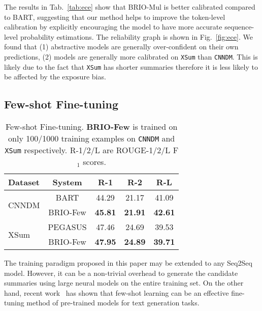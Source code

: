 \documentclass[11pt]{article}
\newcommand{\model}{BRIO\xspace}
\begin{document}
The results in Tab.~\ref{tab:ece} show that \model-Mul is better calibrated compared to BART, suggesting that our method helps to improve the token-level calibration by explicitly encouraging the model to have more accurate sequence-level probability estimations.
The reliability graph is shown in Fig.~\ref{fig:ece}.
We found that (1) abstractive models are generally over-confident on their own predictions, 
(2) models are generally more calibrated on \texttt{XSum} than \texttt{CNNDM}.
This is likely due to the fact that \texttt{XSum} has shorter summaries therefore it is less likely to be affected by the exposure bias. 





\subsection{Few-shot Fine-tuning}

\begin{table}
\centering
\small
\begin{tabular}{lcccc}
\toprule
\textbf{Dataset} & \textbf{System} & \textbf{R-1} & \textbf{R-2} & \textbf{R-L}  \\
\midrule
 \multirow{2}{*}{CNNDM} & BART & 44.29 & 21.17 & 41.09 \\
& \model-Few & \textbf{45.81} & \textbf{21.91} & \textbf{42.61} \\
\midrule
 \multirow{2}{*}{XSum} & PEGASUS & 47.46 & 24.69 & 39.53\\
& \model-Few & \textbf{47.95} & \textbf{24.89} & \textbf{39.71} \\
\bottomrule
\end{tabular}
\vspace{-5pt}
\caption{\label{tab:few-shot} Few-shot Fine-tuning.
\textbf{\model-Few} is trained on only 100/1000 training examples on \texttt{CNNDM} and \texttt{XSum} respectively.
R-1/2/L are ROUGE-1/2/L F$_1$ scores.}
\vspace{-8pt}
\end{table}

The training paradigm proposed in this paper may be extended to any Seq2Seq model. 
However, it can be a non-trivial overhead to generate the candidate summaries using large neural models on the entire training set.
On the other hand, recent work~\citep{JMLR:v21:20-074, zhang2020pegasus, schick-schutze-2021-shot, fabbri-etal-2021-improving} has shown that few-shot learning can be an effective fine-tuning method of pre-trained models for text generation tasks.
\end{document}
